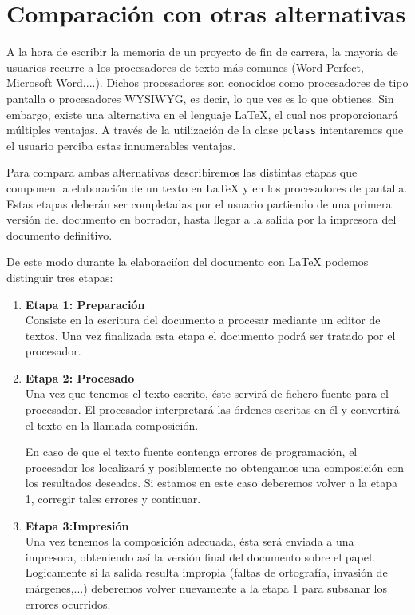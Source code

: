 \chapter{Comparaci\'on con otras alternativas}\label{alternativas}

A la hora de escribir la memoria de un proyecto de fin de carrera, la mayor\'ia de usuarios recurre a los
procesadores de texto m\'as comunes (Word Perfect, Microsoft Word,...). Dichos procesadores son conocidos como 
procesadores de tipo pantalla o procesadores WYSIWYG, es decir, lo que ves es lo que obtienes. Sin embargo, existe una
alternativa en el lenguaje \LaTeX{}, el cual nos proporcionar\'a m\'ultiples ventajas. A trav\'es de la utilizaci\'on
de la clase \texttt{pclass} intentaremos que el usuario perciba estas innumerables ventajas.

Para compara ambas alternativas describiremos las distintas etapas que componen la elaboraci\'on de un texto en \LaTeX{}
y en los procesadores de pantalla. Estas etapas deber\'an ser completadas por el usuario partiendo de una primera
versi\'on del documento en borrador, hasta llegar a la salida por la impresora del documento definitivo.

De este modo durante la elaboraci\'ion del documento con \LaTeX{} podemos distinguir tres etapas:

\begin{enumerate}
	\item  \textbf{Etapa 1: Preparaci\'on}\\
				Consiste en la escritura del documento a procesar mediante un editor de textos. Una vez finalizada esta etapa 
				el documento podr\'a ser tratado por el procesador.
				
	\item \textbf{Etapa 2: Procesado}\\
				Una vez que tenemos el texto escrito, \'este servir\'a de fichero fuente para el procesador. El procesador 
				interpretar\'a las \'ordenes escritas en \'el y convertir\'a el texto en la llamada composici\'on.
				
				En caso de que el texto fuente contenga errores de programaci\'on, el procesador los localizar\'a y posiblemente 
				no obtengamos una composici\'on con los resultados deseados. Si estamos en este caso deberemos volver a la etapa 1,
				corregir tales errores y continuar.
				  
	\item \textbf{Etapa 3:Impresi\'on} \\
				Una vez tenemos la composici\'on adecuada, \'esta ser\'a enviada a una impresora, obteniendo as\'i la versi\'on 
				final del documento sobre el papel. Logicamente si la salida resulta impropia (faltas de ortograf\'ia, invasi\'on 
				de m\'argenes,...) deberemos volver nuevamente a la etapa 1 para subsanar los errores ocurridos.
\end{enumerate}

